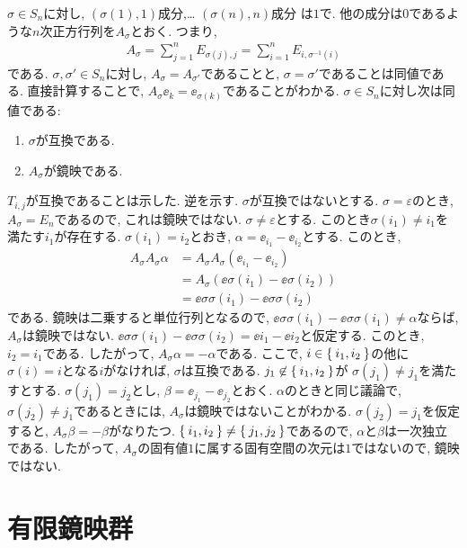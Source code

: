 \begin{example}
  $\sigma \in S_n$に対し,
  $(\sigma(1),1)$成分,\ldots
  $(\sigma(n),n)$成分
  は$1$で. 他の成分は$0$であるような$n$次正方行列を$A_\sigma$とおく.
  つまり,
  \begin{align*}
    A_\sigma = \sum_{j=1}^{n} E_{\sigma(j),j} = \sum_{i=1}^{n} E_{i,\sigma^{-1}(i)}
  \end{align*}
  である.
  $\sigma,\sigma'\in S_n$に対し, $A_\sigma=A_{\sigma'}$であることと,
  $\sigma=\sigma'$であることは同値である.
  直接計算することで,
  $A_\sigma \ee_k=\ee_{\sigma(k)}$であることがわかる.
  $\sigma\in S_n$に対し次は同値である:
  \begin{enumerate}
  \item $\sigma$が互換である.
  \item $A_\sigma$が鏡映である.
  \end{enumerate}
  $T_{i,j}$が互換であることは示した.
  逆を示す.
  $\sigma$が互換ではないとする.
  $\sigma=\varepsilon$のとき, $A_\sigma=E_n$であるので, これは鏡映ではない.
  $\sigma\neq\varepsilon$とする.
  このとき$\sigma(i_1)\neq i_1$を満たす$i_1$が存在する.
  $\sigma(i_1)=i_2$とおき,
  $\alpha=\ee_{i_1}-\ee_{i_2}$とする.
  このとき,
  \begin{align*}
    A_\sigma A_\sigma\alpha
    &= A_\sigma A_\sigma (\ee_{i_1}-\ee_{i_2})\\
    &= A_\sigma(\ee{\sigma(i_1)}-\ee{\sigma(i_2)})\\
    &= \ee{\sigma\sigma(i_1)}-\ee{\sigma\sigma(i_2)}
  \end{align*}
  である. 鏡映は二乗すると単位行列となるので,
  $\ee{\sigma\sigma(i_1)}-\ee{\sigma\sigma(i_1)}\neq \alpha$ならば,
  $A_\sigma$は鏡映ではない.
  $\ee{\sigma\sigma(i_1)}-\ee{\sigma\sigma(i_2)}=\ee{i_1}-\ee{i_2}$と仮定する.
  このとき, $i_2=i_1$である.
  したがって,  $A_\sigma \alpha = -\alpha$である.
  ここで,
  $i\in \Set{i_1, i_2}$の他に$\sigma(i)=i$となる$i$がなければ, $\sigma$は互換である.
  $j_1\not\in \Set{i_1,i_2}$が
  $\sigma(j_1)\neq j_1$を満たすとする.
  $\sigma(j_1)=j_2$とし, $\beta=\ee_{j_1}-\ee_{j_2}$とおく.
  $\alpha$のときと同じ議論で,
  $\sigma(j_2)\neq j_1$であるときには, $A_\sigma$は鏡映ではないことがわかる.
  $\sigma(j_2)= j_1$を仮定すると, $A_\sigma \beta=-\beta$がなりたつ.
  $\Set{i_1,i_2}\neq \Set{j_1,j_2}$であるので,
  $\alpha$と$\beta$は一次独立である.
  したがって, $A_\sigma$の固有値$1$に属する固有空間の次元は$1$ではないので,
  鏡映ではない.
\end{example}


\chapter{有限鏡映群}

